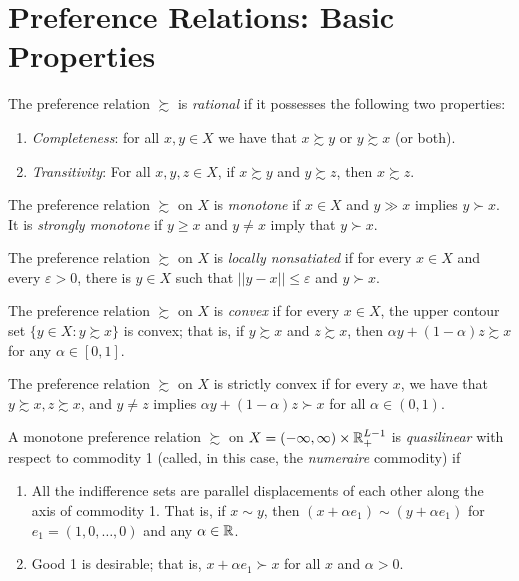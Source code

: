 \addtocounter{section}{1}

\section{Preference Relations: Basic Properties}

\begin{defn}
    The preference relation $\succsim$ is \emph{rational} if it possesses the following two properties:
    \begin{enumerate}
        \item \emph{Completeness}: for all $x, y \in X$ we have that $x \succsim y$ or $y \succsim x$ (or both).
        \item \emph{Transitivity}: For all $x, y, z \in X$, if $x \succsim y$ and $y \succsim z$, then $x \succsim z$.
    \end{enumerate}
\end{defn}

\begin{defn}
    The preference relation $\succsim$ on $X$ is \emph{monotone} if $x \in X$ and $y \gg x$ implies $y \succ x$. It is \emph{strongly monotone} if $y \geq x$ and $y \neq x$ imply that $y \succ x$.
\end{defn}

\begin{defn}
    The preference relation $\succsim$ on $X$ is \emph{locally nonsatiated} if for every $x \in X$ and every $\varepsilon > 0$, there is $y \in X$ such that $||y - x || \leq \varepsilon$ and $y \succ x$.
\end{defn}

\begin{defn}
    The preference relation $\succsim$ on $X$ is \emph{convex} if for every $x \in X$, the upper contour set $\{y \in X: y \succsim x\}$ is convex; that is, if $y \succsim x$ and $z \succsim x$, then $\alpha y + (1 - \alpha) z \succsim x$ for any $\alpha \in [0, 1]$.
\end{defn}

\begin{defn}
    The preference relation $\succsim$ on $X$ is strictly convex if for every $x$, we have that $y \succsim x, z \succsim x$, and $y \neq z$ implies $\alpha y + (1 - \alpha) z \succ x$ for all $\alpha \in (0, 1)$.
\end{defn}

\begin{defn}
    A monotone preference relation $\succsim$ on $X = (-\infty, \infty) \times \mathbb{R}^{L - 1}_+$ is \emph{quasilinear} with respect to commodity 1 (called, in this case, the \emph{numeraire} commodity) if 
    \begin{enumerate}
        \item All the indifference sets are parallel displacements of each other along the axis of commodity 1. That is, if $x \sim y$, then $(x + \alpha e_1) \sim (y + \alpha e_1)$ for $e_1 = (1, 0, \dots, 0)$ and any $\alpha \in \mathbb{R}$.
        \item Good 1 is desirable; that is, $x + \alpha e_1 \succ x$ for all $x$ and $\alpha > 0$.
    \end{enumerate}
\end{defn}



